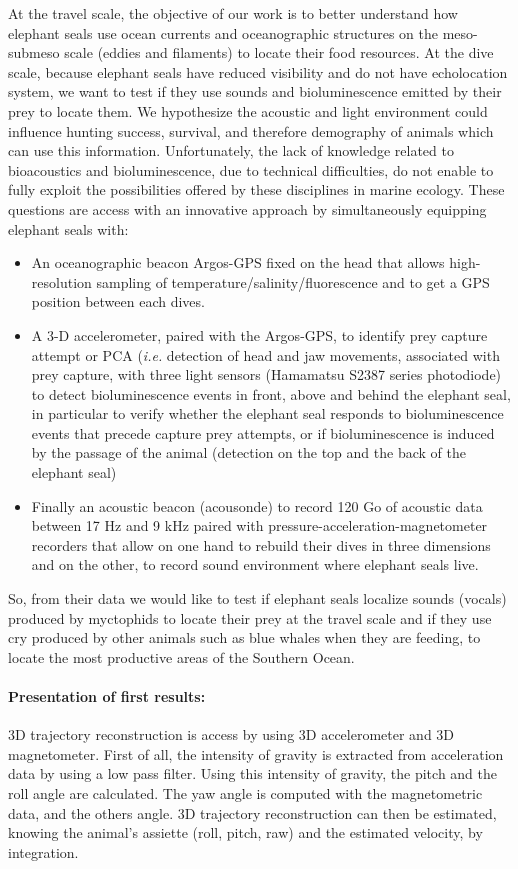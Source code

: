 \documentclass[12pt,a4paper]{report}
\begin{document}
At the travel scale, the objective of our work is to better understand how elephant seals use ocean currents and oceanographic structures on the meso-submeso scale (eddies and filaments) to locate their food resources. At the dive scale, because elephant seals have reduced visibility and do not have echolocation system, we want to test if they use sounds and bioluminescence emitted by their prey to locate them. We hypothesize the acoustic and light environment could influence hunting success, survival, and therefore demography of animals which can use this information. Unfortunately, the lack of knowledge related to bioacoustics and bioluminescence, due to technical difficulties, do not enable to fully exploit the possibilities offered by these disciplines in marine ecology. These questions are access with an innovative approach by simultaneously equipping elephant seals with: 
	\begin{itemize}
	\item An oceanographic beacon Argos-GPS fixed on the head that allows high-resolution sampling of temperature/salinity/fluorescence and to get a GPS position between each dives.
	\item A 3-D accelerometer, paired with the Argos-GPS, to identify prey capture attempt or PCA (\textit{i.e.} detection of head and jaw movements, associated with prey capture, with three light sensors (Hamamatsu S2387 series photodiode) to detect bioluminescence events in front, above and behind the elephant seal, in particular to verify whether the elephant seal responds to bioluminescence events that precede capture prey attempts, or if bioluminescence is induced by the passage of the animal (detection on the top and the back of the elephant seal)
	\item Finally an acoustic beacon (acousonde) to record 120 Go of acoustic data between 17 Hz and 9 kHz paired with pressure-acceleration-magnetometer recorders that allow on one hand to rebuild their dives in three dimensions and on the other, to record sound environment where elephant seals live. 
	\end{itemize}
So, from their data we would like to test if elephant seals localize sounds (vocals) produced by myctophids to locate their prey at the travel scale and if they use cry produced by other animals such as blue whales when they are feeding, to locate the most productive areas of the Southern Ocean.

\paragraph{Presentation of first results:}
3D trajectory reconstruction is access by using 3D accelerometer and 3D magnetometer. First of all, the intensity of gravity is extracted from acceleration data by using a low pass filter. Using this intensity of gravity, the pitch and the roll angle are calculated. The yaw angle is computed with the magnetometric data, and the others angle. 3D trajectory reconstruction can then be estimated, knowing the animal’s assiette (roll, pitch, raw) and the estimated velocity, by integration.
\end{document}
